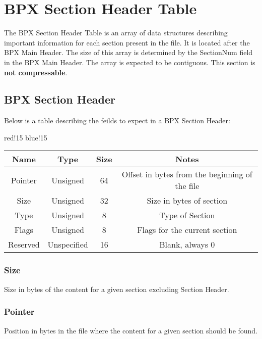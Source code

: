 \section{BPX Section Header Table}
The BPX Section Header Table is an array of data structures describing important information for each section present in the file. It is located after the BPX Main Header.\newline
The size of this array is determined by the SectionNum field in the BPX Main Header. The array is expected to be contiguous.\newline
This section is \textbf{not compressable}.

\subsection{BPX Section Header}
Below is a table describing the feilds to expect in a BPX Section Header:
\begin{center}
    {
        {red!15}
        {blue!15}
        \begin{tabular}{|c|c|c|c|}
            \hline
            \textbf{Name} & \textbf{Type} & \textbf{Size} & \textbf{Notes} \\
    
            \hline\hline
            Pointer & Unsigned & 64 & Offset in bytes from the beginning of the file \\
            Size & Unsigned & 32 & Size in bytes of section \\
            Type & Unsigned & 8 & Type of Section \\
            Flags & Unsigned & 8 & Flags for the current section \\
            Reserved & Unspecified & 16 & Blank, always 0 \\
            \hline
        \end{tabular}
    }
\end{center}

\subsubsection{Size}
Size in bytes of the content for a given section excluding Section Header.

\subsubsection{Pointer}
Position in bytes in the file where the content for a given section should be found.

